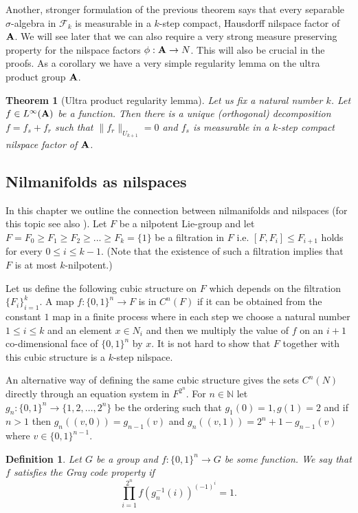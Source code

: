 \documentclass [11pt] {article}
\newtheorem{theorem}{Theorem}
\newtheorem{definition}{Definition}[section]
\def\bA{{\bf A}}
\begin{document}
Another, stronger formulation of the previous theorem says that every separable $\sigma$-algebra in $\mathcal{F}_k$ is measurable in a  $k$-step compact, Hausdorff nilspace factor of $\bA$.
We will see later that we can also require a very strong measure preserving property for the nilspace factors $\phi:\bA\rightarrow N$. This will also be crucial in the proofs.
As a corollary we have a very simple regularity lemma on the ultra product group $\bA$.

\begin{theorem}[Ultra product regularity lemma]\label{ultreg} Let us fix a natural number $k$. Let $f\in L^\infty(\bA)$ be a function. Then there is a unique (orthogonal) decomposition $f=f_s+f_r$ such that $\|f_r\|_{U_{k+1}}=0$ and $f_s$ is measurable in a $k$-step compact nilspace factor of $\bA$.
\end{theorem}

\subsection{Nilmanifolds as nilspaces}\label{nilasnil}

In this chapter we outline the connection between nilmanifolds and nilspaces (for this topic see also \cite{NP}).
Let $F$ be a nilpotent Lie-group and let $F=F_0\geq F_1\geq F_2\geq...\geq F_k=\{1\}$ be a filtration in $F$ i.e. $[F,F_i]\leq F_{i+1}$ holds for every $0\leq i\leq k-1$. (Note that the existence of such a filtration implies that $F$ is at most $k$-nilpotent.)

Let us define the following cubic structure on $F$ which depends on the filtration $\{F_i\}_{i=1}^k$.
A map $f:\{0,1\}^n\rightarrow F$ is in $C^n(F)$ if it can be obtained from the constant $1$ map in a finite process where in each step we choose a natural number $1\leq i\leq k$ and an element $x\in N_i$ and then we multiply the value of $f$ on an $i+1$ co-dimensional face of $\{0,1\}^n$ by $x$. 
It is not hard to show that $F$ together with this cubic structure is a $k$-step nilspace.

An alternative way of defining the same cubic structure gives the sets $C^n(N)$ directly through an equation system in $F^{2^n}$. For $n\in\mathbb{N}$ let $g_n:\{0,1\}^n\rightarrow\{1,2,\dots,2^n\}$ be the ordering such that $g_1(0)=1,g(1)=2$ and if $n>1$ then $g_n((v,0))=g_{n-1}(v)$ and $g_n((v,1))=2^n+1-g_{n-1}(v)$ where $v\in\{0,1\}^{n-1}$.

\begin{definition} Let $G$ be a group and $f:\{0,1\}^n\rightarrow G$ be some function. We say that $f$ satisfies the Gray code property if $$\prod_{i=1}^{2^n}f(g_n^{-1}(i))^{(-1)^i}=1.$$
\end{definition}
\end{document}
